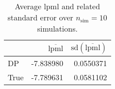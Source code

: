 \begin{table}[H]

\caption{Average lpml and related standard error over $n_{\text{sim}} = 10$ simulations.}
\centering
\begin{tabular}[t]{lrr}
\toprule
  & $\overbar{\text{lpml}}$ & $\text{sd}(\overbar{\text{lpml}})$\\
\midrule
DP & -7.838980 & 0.0550371\\
True & -7.789631 & 0.0581102\\
\bottomrule
\end{tabular}
\end{table}